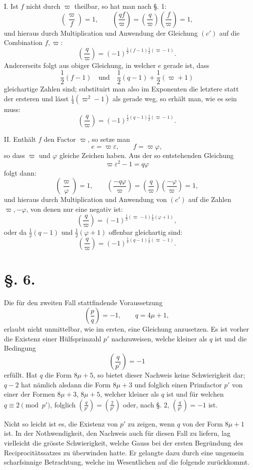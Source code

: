 \documentclass[11pt]{article}
\newcommand{\J}[2]{\left(\frac{#1}{#2}\right)}
\begin{document}
I. Ist $f$ nicht durch $\varpi$ theilbar, so hat man nach \S. 1:
\[
 \J{\varpi}{f}=1,\qquad \J{qf}{\varpi}=\J{q}{\varpi}\J{f}{\varpi}=1,
\]
und hieraus durch Multiplication und Anwendung der Gleichung $(c')$ auf die Combination $f,\varpi$:
\[
 \J{q}{\varpi}=(-1)^{\frac12(f-1)\frac12(\varpi-1)}.
\]
Andererseits folgt aus obiger Gleichung, in welcher $e$ gerade ist, dass
\[
 \frac12(f-1)\quad\text{und}\quad \frac12(q-1)+\frac12(\varpi+1)
\]
gleichartige Zahlen sind; substituirt man also im Exponenten die letztere statt der ersteren und lässt $\frac14(\varpi^2-1)$ als gerade weg, so erhält man, wie es sein muss:
\[
 \J{q}{\varpi}=(-1)^{\frac12(q-1)\frac12(\varpi-1)}.
\]

II. Enthält $f$ den Factor $\varpi$, so setze man
\[
 e=\varpi\varepsilon,
\qquad f=\varpi\varphi,
\]
so dass $\varpi$ und $\varphi$ gleiche Zeichen haben. Aus der so entstehenden Gleichung
\[
 \varpi\varepsilon^2-1=q\varphi
\]
folgt dann:
\[
 \J{\varpi}{\varphi}=1,
\qquad
 \J{-q\varphi}{\varpi}=\J{q}{\varpi}\J{-\varphi}{\varpi}=1,
\]
und hieraus durch Multiplication und Anwendung von $(c')$ auf die Zahlen $\varpi,-\varphi$, von denen nur eine negativ ist:
\[
 \J{q}{\varpi}=(-1)^{\frac12(\varpi-1)\frac12(\varphi+1)},
\]
oder da $\frac12(q-1)$ und $\frac12(\varphi+1)$ offenbar gleichartig sind:
\[
 \J{q}{\varpi}=(-1)^{\frac12(q-1)\frac12(\varpi-1)}.
\]

\section*{\S. 6.}

Die für den zweiten Fall stattfindende Voraussetzung
\[
 \J{p}{q}=-1,\qquad q=4\mu+1,
\]
erlaubt nicht unmittelbar, wie im ersten, eine Gleichung anzusetzen. Es ist vorher die Existenz einer Hülfsprimzahl $p'$ nachzuweisen, welche kleiner als $q$ ist und die Bedingung
\[
 \J{q}{p'}=-1
\]
erfüllt. Hat $q$ die Form $8\mu+5$, so bietet dieser Nachweis keine Schwierigkeit dar; $q-2$ hat nämlich alsdann die Form $8\mu+3$ und folglich einen Primfactor $p'$ von einer der Formen $8\mu+3$, $8\mu+5$, welcher kleiner als $q$ ist und für welchen $q\equiv 2\pmod {p'}$, folglich $\J{q}{p'}=\J{2}{p'}$ oder, nach \S. 2, $\J{q}{p'}=-1$ ist.

Nicht so leicht ist es, die Existenz von $p'$ zu zeigen, wenn $q$ von der Form $8\mu+1$ ist. In der Nothwendigkeit, den Nachweis auch für diesen Fall zu liefern, lag vielleicht die grösste Schwierigkeit, welche Gauss bei der ersten Begründung des Reciprocitätssatzes zu überwinden hatte. Er gelangte dazu durch eine ungemein scharfsinnige Betrachtung, welche im Wesentlichen auf die folgende zurückkommt.
\end{document}
